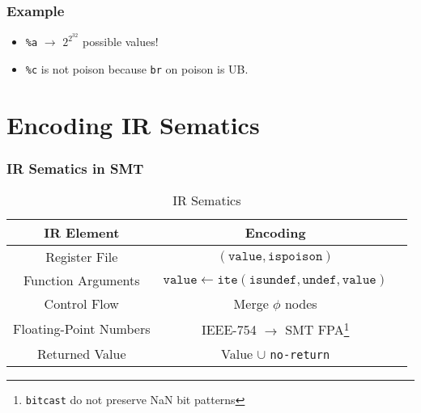 \documentclass[aspectratio=169]{ctexbeamer}
\newcommand{\variable}[1]{\mathtt{#1}}
\begin{document}
\begin{frame}[fragile]
    \frametitle{Example}
    \noindent
    \begin{minipage}[t]{0.5\linewidth}
        
    \end{minipage}
    \hfill%
    \begin{minipage}[t]{0.4\linewidth}
        \begin{itemize}
            \item  \texttt{\%a} $\rightarrow$ $2^{2^{32}}$ possible values!
            \item  \texttt{\%c} is not poison because \texttt{br} on poison is UB.
        \end{itemize}
    \end{minipage}
\end{frame}



\section{Encoding IR Sematics}

\begin{frame}
    \frametitle{IR Sematics in SMT}

    \begin{table}
        \centering
        \caption{IR Sematics}
        \begin{tabular}{ccc}
            \toprule
            \textbf{IR Element}    & \textbf{Encoding}                                                                          \\
            \midrule
            Register File          & $(\variable{value}, \variable{ispoison})$                                                  \\
            Function Arguments     & $\variable{value} \leftarrow \mathtt{ite(isundef, undef, value)}$                          \\
            Control Flow           & Merge $\phi$ nodes                                                                         \\
            Floating-Point Numbers & IEEE-754 $\rightarrow$ SMT FPA\footnote{\texttt{bitcast} do not preserve NaN bit patterns} \\
            Returned Value         & Value $\cup$ \texttt{no-return}                                                            \\
            \bottomrule
        \end{tabular}
    \end{table}

\end{frame}
\end{document}

